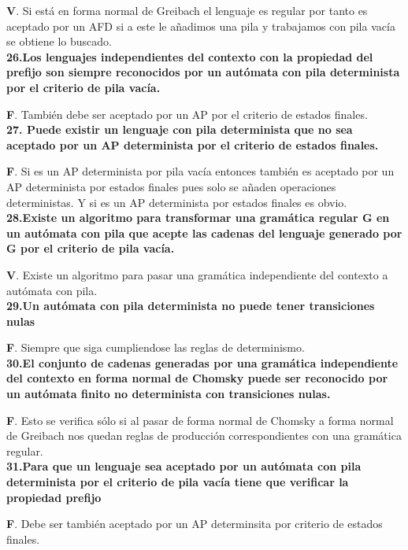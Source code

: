 \documentclass[a4paper,11pt]{article}
\begin{document}
\textbf{V}. Si está en forma normal de Greibach el lenguaje es regular por tanto es aceptado por un AFD si a este le añadimos una pila y trabajamos con pila vacía se obtiene lo buscado. \\

\textbf{26.Los lenguajes independientes del contexto con la propiedad del prefijo son siempre reconocidos por un autómata con pila determinista por el criterio de pila vacía.}

\textbf{F}. También debe ser aceptado por un AP por el criterio de estados finales. \\

\textbf{27. Puede existir un lenguaje con pila determinista que no sea aceptado por un AP determinista por el criterio de estados finales.}

\textbf{F}. Si es un AP determinista por pila vacía entonces también es aceptado por un AP determinista por estados finales pues solo se añaden operaciones deterministas. Y si es un AP determinista por estados finales es obvio. \\

\textbf{28.Existe un algoritmo para transformar una gramática regular G en un autómata con pila que acepte las cadenas del lenguaje generado por G por el criterio de pila vacía.}

\textbf{V}. Existe un algoritmo para pasar una gramática independiente del contexto a autómata con pila. \\

\textbf{29.Un autómata con pila determinista no puede tener transiciones nulas}

\textbf{F}. Siempre que siga cumpliendose las reglas de determinismo. \\

\textbf{30.El conjunto de cadenas generadas por una gramática independiente del contexto en forma normal de Chomsky puede ser reconocido por un autómata finito no determinista con transiciones nulas.}

\textbf{F}. Esto se verifica sólo si al pasar de forma normal de Chomsky a forma normal de Greibach nos quedan reglas de producción correspondientes con una gramática regular. \\

\textbf{31.Para que un lenguaje sea aceptado por un autómata con pila determinista por el criterio de pila vacía tiene que verificar la propiedad prefijo} 

\textbf{F}. Debe ser también aceptado por un AP determinsita por criterio de estados finales. \\
\end{document}
